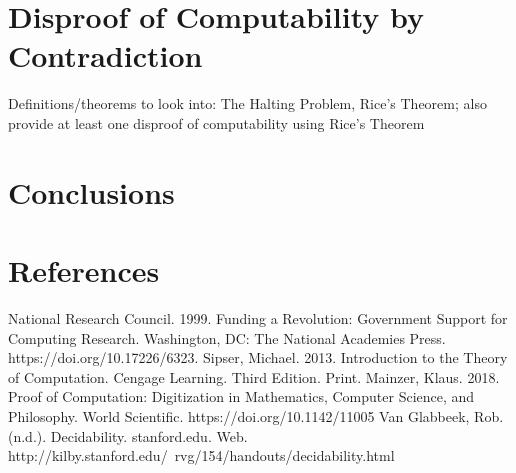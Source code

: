 \documentclass{article}
\begin{document}
\section{Disproof of Computability by Contradiction}
Definitions/theorems to look into: The Halting Problem, Rice's Theorem; also provide at least one disproof of computability using Rice's Theorem

\section{Conclusions}

\section{References}
\begin{thebibliography}{100}
	 National Research Council. 1999. Funding a Revolution: Government Support for Computing Research. Washington, DC: The National Academies Press. https://doi.org/10.17226/6323.
	 Sipser, Michael. 2013. Introduction to the Theory of Computation. Cengage Learning. Third Edition. Print.
	 Mainzer, Klaus. 2018. Proof of Computation: Digitization in Mathematics, Computer Science, and Philosophy. World Scientific. https://doi.org/10.1142/11005
	 Van Glabbeek, Rob. (n.d.). Decidability. stanford.edu. Web. http://kilby.stanford.edu/~rvg/154/handouts/decidability.html
\end{thebibliography}
\end{document}
